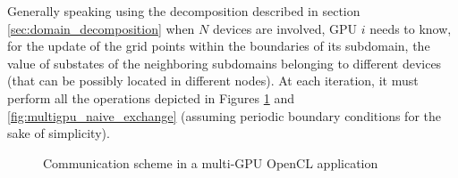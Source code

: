 Generally speaking using the decomposition described in section \ref{sec:domain_decomposition} when $N$ devices are involved, GPU $i$ needs to know, for the update of the grid points within the boundaries of its subdomain, the value of substates of the neighboring subdomains belonging to different devices (that can be possibly located in different nodes). 
At each iteration, it must perform all the operations depicted in Figures \ref{fig:communication_scheme} and \ref{fig:multigpu_naive_exchange} (assuming periodic boundary conditions for the sake of simplicity).
\begin{figure}[H]
\label{fig:communication_scheme}
\caption{Communication scheme in a multi-GPU OpenCL application}
\end{figure}


